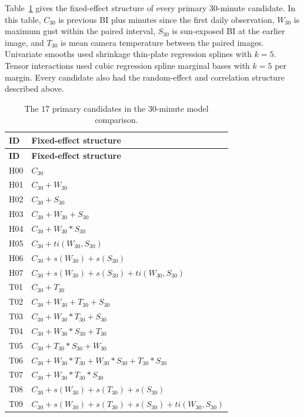 \documentclass[insects,article,submit,pdftex,moreauthors]{Definitions/mdpi}
\begin{document}
\begin{appendix}
Table~\ref{tab:30min_candidates} gives the fixed-effect structure of every primary 30-minute candidate. In this table, $C_{30}$ is previous BI plus minutes since the first daily observation, $W_{30}$ is maximum gust within the paired interval, $S_{30}$ is sun-exposed BI at the earlier image, and $T_{30}$ is mean camera temperature between the paired images. Univariate smooths used shrinkage thin-plate regression splines with $k=5$. Tensor interactions used cubic regression spline marginal bases with $k=5$ per margin. Every candidate also had the random-effect and correlation structure described above.

\begin{longtable}{@{}p{}p{}@{}}
\caption{The 17 primary candidates in the 30-minute model comparison.} \label{tab:30min_candidates} \\
\toprule
\textbf{ID} & \textbf{Fixed-effect structure} \\
\midrule
\endfirsthead
\toprule
\textbf{ID} & \textbf{Fixed-effect structure} \\
\midrule
\endhead
H00 & $C_{30}$ \\
H01 & $C_{30} + W_{30}$ \\
H02 & $C_{30} + S_{30}$ \\
H03 & $C_{30} + W_{30} + S_{30}$ \\
H04 & $C_{30} + W_{30} * S_{30}$ \\
H05 & $C_{30} + ti(W_{30},S_{30})$ \\
H06 & $C_{30} + s(W_{30}) + s(S_{30})$ \\
H07 & $C_{30} + s(W_{30}) + s(S_{30}) + ti(W_{30},S_{30})$ \\
T01 & $C_{30} + T_{30}$ \\
T02 & $C_{30} + W_{30} + T_{30} + S_{30}$ \\
T03 & $C_{30} + W_{30} * T_{30} + S_{30}$ \\
T04 & $C_{30} + W_{30} * S_{30} + T_{30}$ \\
T05 & $C_{30} + T_{30} * S_{30} + W_{30}$ \\
T06 & $C_{30} + W_{30} * T_{30} + W_{30} * S_{30} + T_{30} * S_{30}$ \\
T07 & $C_{30} + W_{30} * T_{30} * S_{30}$ \\
T08 & $C_{30} + s(W_{30}) + s(T_{30}) + s(S_{30})$ \\
T09 & $C_{30} + s(W_{30}) + s(T_{30}) + s(S_{30}) + ti(W_{30},S_{30})$ \\
\bottomrule
\end{longtable}


\end{appendix}
\end{document}
